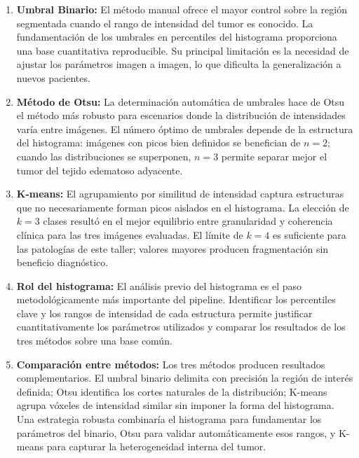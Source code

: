 \documentclass[12pt, a4paper]{article}
\begin{document}
\begin{enumerate}

  \item \textbf{Umbral Binario:} El método manual ofrece el mayor control sobre la
    región segmentada cuando el rango de intensidad del tumor es conocido. La
    fundamentación de los umbrales en percentiles del histograma proporciona una base
    cuantitativa reproducible. Su principal limitación es la necesidad de ajustar los
    parámetros imagen a imagen, lo que dificulta la generalización a nuevos pacientes.

  \item \textbf{Método de Otsu:} La determinación automática de umbrales hace de Otsu
    el método más robusto para escenarios donde la distribución de intensidades varía
    entre imágenes. El número óptimo de umbrales depende de la estructura del histograma:
    imágenes con picos bien definidos se benefician de $n=2$; cuando las distribuciones
    se superponen, $n=3$ permite separar mejor el tumor del tejido edematoso adyacente.

  \item \textbf{K-means:} El agrupamiento por similitud de intensidad captura
    estructuras que no necesariamente forman picos aislados en el histograma. La
    elección de $k=3$ clases resultó en el mejor equilibrio entre granularidad y
    coherencia clínica para las tres imágenes evaluadas. El límite de $k=4$ es
    suficiente para las patologías de este taller; valores mayores producen
    fragmentación sin beneficio diagnóstico.

  \item \textbf{Rol del histograma:} El análisis previo del histograma es el paso
    metodológicamente más importante del pipeline. Identificar los percentiles clave
    y los rangos de intensidad de cada estructura permite justificar cuantitativamente
    los parámetros utilizados y comparar los resultados de los tres métodos sobre una
    base común.

  \item \textbf{Comparación entre métodos:} Los tres métodos producen resultados
    complementarios. El umbral binario delimita con precisión la región de interés
    definida; Otsu identifica los cortes naturales de la distribución; K-means agrupa
    vóxeles de intensidad similar sin imponer la forma del histograma. Una estrategia
    robusta combinaría el histograma para fundamentar los parámetros del binario,
    Otsu para validar automáticamente esos rangos, y K-means para capturar la
    heterogeneidad interna del tumor.

\end{enumerate}
\end{document}
